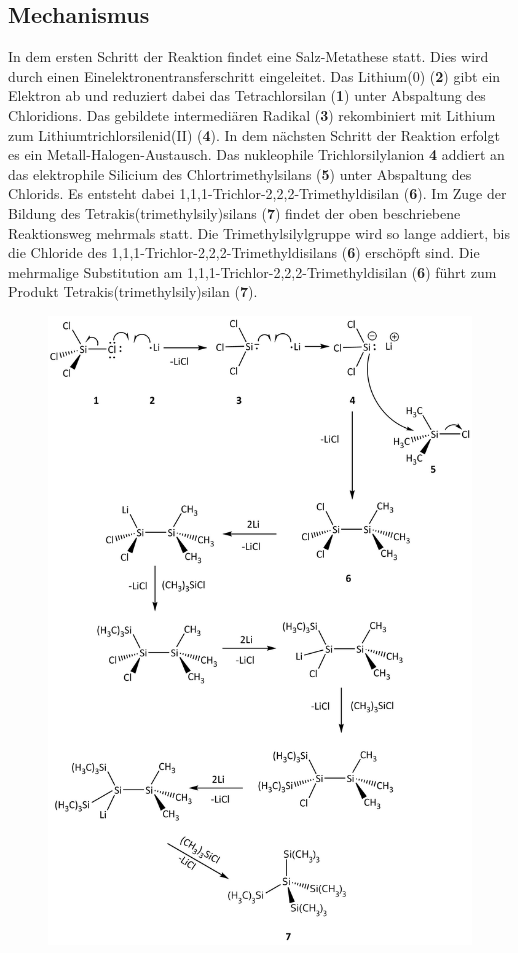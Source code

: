 \documentclass[12pt]{article}
\begin{document}
\begin{onehalfspace}
\section{Mechanismus\cite{silicongilman}}
In dem ersten Schritt der Reaktion findet eine Salz-Metathese statt. Dies wird durch einen Einelektronentransferschritt eingeleitet.
Das Lithium(0) (\textbf{2}) gibt ein Elektron ab und reduziert dabei das Tetrachlorsilan (\textbf{1}) unter Abspaltung des Chloridions.
Das gebildete intermediären Radikal (\textbf{3}) rekombiniert mit Lithium zum Lithiumtrichlorsilenid(II) (\textbf{4}). In dem nächsten Schritt der Reaktion 
erfolgt es ein Metall-Halogen-Austausch. Das nukleophile Trichlorsilylanion \textbf{4} addiert an das elektrophile Silicium des Chlortrimethylsilans (\textbf{5}) unter Abspaltung des Chlorids. Es entsteht dabei 1,1,1-Trichlor-2,2,2-Trimethyldisilan (\textbf{6}). Im Zuge der Bildung des Tetrakis(trimethylsily)silans (\textbf{7}) findet der oben beschriebene Reaktionsweg mehrmals statt. Die Trimethylsilylgruppe wird so lange addiert, bis die Chloride des 1,1,1-Trichlor-2,2,2-Trimethyldisilans (\textbf{6}) erschöpft sind. Die mehrmalige Substitution am 1,1,1-Trichlor-2,2,2-Trimethyldisilan (\textbf{6}) führt zum Produkt Tetrakis(trimethylsily)silan (\textbf{7}).\\
\begin{figure}[!htbp]
   \centering
\includegraphics[scale=0.3]{mechan.png}
\end{figure}
\newpage


\end{onehalfspace}
\end{document}
